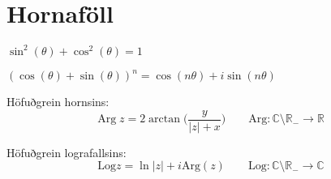 \noindent
\section*{Hornaföll}


\begin{minipage}{.5\linewidth}
  $\sin^2(\theta) + \cos^2(\theta) =1$
\end{minipage}%
\begin{minipage}{.5\linewidth}
	$(\cos(\theta)+\sin(\theta))^n = \cos(n\theta)+i\sin(n\theta)$
\end{minipage}

Höfuðgrein hornsins:
\begin{equation*}
  \text{Arg} \; z = 2 \arctan \bigg(\frac{y}{|z| + x} \biggl) \quad \quad \text{Arg} : \mathbb{C} \setminus \mathbb{R_{-}} \to \mathbb{R}
\end{equation*}

\noindent Höfuðgrein lografallsins:
\begin{equation*}
    \text{Log} z = \ln |z| + i \text{Arg}(z) \quad  \quad \text{Log}: \mathbb{C} \setminus \mathbb{R_{-}} \to \mathbb{C}
\end{equation*}
